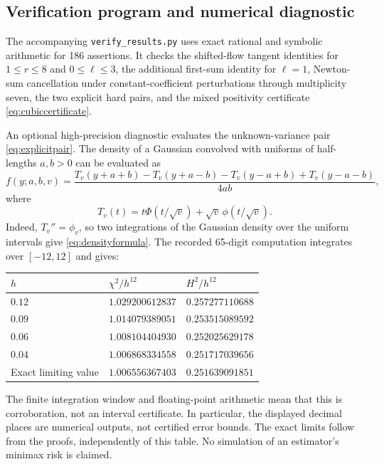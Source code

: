 \documentclass[11pt,a4paper]{article}
\numberwithin{equation}{section}
\theoremstyle{definition}
\theoremstyle{remark}
\begin{document}
\subsection{Verification program and numerical diagnostic}
The accompanying \texttt{verify\_results.py} uses exact rational and symbolic
arithmetic for 186 assertions. It checks the shifted-flow tangent identities
for $1\le r\le8$ and $0\le\ell\le3$, the additional first-sum identity for
$\ell=1$, Newton-sum cancellation under constant-coefficient perturbations
through multiplicity seven, the two explicit hard pairs, and the mixed
positivity certificate \eqref{eq:cubiccertificate}.

An optional high-precision diagnostic evaluates the unknown-variance pair
\eqref{eq:explicitpair}. The density of a Gaussian convolved with uniforms
of half-lengths $a,b>0$ can be evaluated as
\begin{equation}
 f(y;a,b,v)=\frac{T_v(y+a+b)-T_v(y+a-b)-T_v(y-a+b)+T_v(y-a-b)}{4ab},
 \label{eq:densityformula}
\end{equation}
where
\begin{equation}
 T_v(t)=t\Phi(t/\sqrt v)+\sqrt v\,\phi(t/\sqrt v).
\end{equation}
Indeed, $T_v''=\phi_v$, so two integrations of the Gaussian density over the
uniform intervals give \eqref{eq:densityformula}.
The recorded 65-digit computation integrates over $[-12,12]$ and gives:
\begin{center}
\begin{tabular}{@{}lll@{}}
\toprule
$h$ & $\chi^2/h^{12}$ & $H^2/h^{12}$\\
\midrule
$0.12$ & $1.029200612837$ & $0.257277110688$\\
$0.09$ & $1.014079389051$ & $0.253515089592$\\
$0.06$ & $1.008104404930$ & $0.252025629178$\\
$0.04$ & $1.006868334558$ & $0.251717039656$\\
Exact limiting value & $1.006556367403$ & $0.251639091851$\\
\bottomrule
\end{tabular}
\end{center}
The finite integration window and floating-point arithmetic mean that this
is corroboration, not an interval certificate. In particular, the displayed
decimal places are numerical outputs, not certified error bounds. The exact
limits follow from the proofs, independently of this table. No simulation of
an estimator's minimax risk is claimed.
\end{document}
